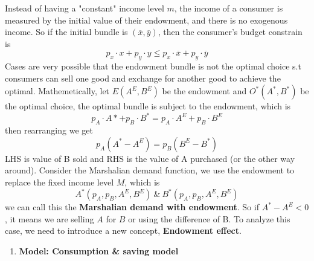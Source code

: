 \documentclass[10pt]{article}
\newenvironment{changemargin}[2]{%
  \begin{list}{}{%
    \setlength{\topsep}{0pt}%
    \setlength{\leftmargin}{#1}%
    \setlength{\rightmargin}{#2}%
    \setlength{\listparindent}{\parindent}%
    \setlength{\itemindent}{\parindent}%
    \setlength{\parsep}{\parskip}%
  }%
  \item[]}{\end{list}}
\begin{document}
\begin{changemargin}{-0.125in}{0in}
\begin{enumerate}
                  Instead of having a "constant" income level $m$, the income of a consumer is measured by the initial value of their endowment, and there is no exogenous income. So if the initial bundle is $(\overline{x}, \overline{y})$, then the consumer's budget constrain is 
                  \[
                  p_x\cdot x + p_y\cdot y \leq p_x\cdot \overline{x} + p_y\cdot\overline{y}
                  \]
                  Cases are very possible that the endowment bundle is not the optimal choice s.t consumers can sell one good and exchange for another good to achieve the optimal. Mathemetically, let $E(A^E,B^E )$ be the endowment and $O^*(A^*,B^*)$ be the optimal choice, the optimal bundle is subject to the endowment, which is 
                  \[
                  p_A\cdot A* + p_B\cdot B^* = p_A\cdot A^E + p_B \cdot B^E
                  \]
                  then rearranging  we get 
                  \[
                  p_A(A^*-A^E) = p_B(B^E-B^*)
                  \]
                  LHS is value of B sold and RHS is the value of A purchased (or the other way around). Consider the Marshalian demand function, we use the endowment to replace the fixed income level $M$, which is 
                  \[
                  A^*(p_A,p_B,A^E,B^E) \: \& \: B^*(p_A,p_B,A^E,B^E) 
                  \]
                  we can call this the \textbf{Marshalian demand with endowment}. So if $A^*-A^E < 0$, it means we are selling $A$ for $B$ or using the difference of B. To analyze this case, we need to introduce a new concept, \textbf{Endowment effect}.
                  
                  
                  
                  
                   
%                  
%

                  \medskip
                  
                  \begin{enumerate}
                    \item \textbf{Model: Consumption \& saving model}
                    

\end{enumerate}
\end{enumerate}
\end{changemargin}
\end{document}
